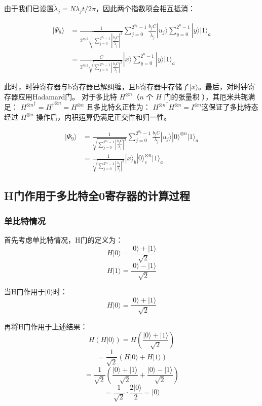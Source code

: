 \documentclass{article}
\begin{document}
由于我们已设置\(\tilde{\lambda}_j = N \lambda_j t / 2\pi\)，因此两个指数项会相互抵消：

\[
\begin{aligned}
|\Psi_8\rangle &= \frac{1}{2^{n/2} \sqrt{\sum_{j=0}^{2^{n_b}-1} \left| \frac{b_j C}{\tilde{\lambda}_j} \right|^2}} \sum_{j=0}^{2^{n_b}-1} \frac{b_j C}{\tilde{\lambda}_j} |u_j\rangle \sum_{y=0}^{2^n - 1} |y\rangle |1\rangle_a \\
&= \frac{C}{2^{n/2} \sqrt{\sum_{j=0}^{2^{n_b}-1} \left| \frac{b_j C}{\lambda_j} \right|^2}} |x\rangle \sum_{y=0}^{2^n - 1} |y\rangle |1\rangle_a
\end{aligned}
\]

此时，时钟寄存器与b寄存器已解纠缠，且b寄存器中存储了\(|x\rangle\)。最后，对时钟寄存器应用Hadamard门。
对于多比特 \( H^{\otimes n} \)（\( n \) 个 \( H \) 门的张量积 ），其厄米共轭满足：
\({H^{\otimes n}}^\dagger = {H^\dagger}^{\otimes n} = H^{\otimes n}\)
且多比特幺正性为：
\({H^{\otimes n}}^\dagger {H^{\otimes n}} = I^{\otimes n}\)这保证了多比特态经过 \( H^{\otimes n} \) 操作后，内积运算仍满足正交性和归一性。

\[
\begin{aligned}
|\Psi_9\rangle &= \frac{1}{\sqrt{\sum_{j=0}^{2^{n_b}-1} \left| \frac{b_j C}{\lambda_j} \right|^2}} \sum_{j=0}^{2^{n_b}-1} \frac{b_j C}{\lambda_j} |u_j\rangle |0\rangle^{\otimes n} |1\rangle_a \\
&= \frac{1}{\sqrt{\sum_{j=0}^{2^{n_b}-1} \left| \frac{b_j}{\lambda_j} \right|^2}} |x\rangle_b |0\rangle_c^{\otimes n} |1\rangle_a
\end{aligned}
\]



\subsection{H门作用于多比特全0寄存器的计算过程}

\subsubsection{单比特情况}

首先考虑单比特情况，H门的定义为：
\[
H|0\rangle = \frac{|0\rangle + |1\rangle}{\sqrt{2}}
\]
\[
H|1\rangle = \frac{|0\rangle - |1\rangle}{\sqrt{2}}
\]

当H门作用于$|0\rangle$时：
\[
H|0\rangle = \frac{|0\rangle + |1\rangle}{\sqrt{2}}
\]

再将H门作用于上述结果：
\[
H\left(H|0\rangle\right) = H\left(\frac{|0\rangle + |1\rangle}{\sqrt{2}}\right)
\]
\[
= \frac{1}{\sqrt{2}}\left(H|0\rangle + H|1\rangle\right)
\]
\[
= \frac{1}{\sqrt{2}}\left(\frac{|0\rangle + |1\rangle}{\sqrt{2}} + \frac{|0\rangle - |1\rangle}{\sqrt{2}}\right)
\]
\[
= \frac{1}{\sqrt{2}} \cdot \frac{2|0\rangle}{2} = |0\rangle
\]
\end{document}

